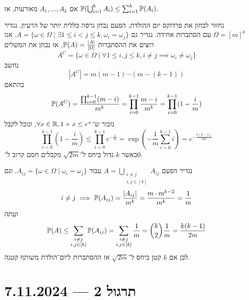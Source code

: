 \begin{theorem}
	אם $A_1, \dots, A_k$ מאורעות, אז $\mathbb{P}(\bigcup_{i = 1}^k A_i) \le \sum_{i = 1}^k \mathbb{P}(A_i)$.
\end{theorem}
\begin{example}
	נחזור לבחון את פרדוקס יום ההולדת, הפעם נבחן גרסה כללית יותר של הרעיון.
	נגדיר $\Omega = {[m]}^k$ עם הסתברות אחידה.
	נגדיר גם $A = \{ \omega \in \Omega \mid \exists 1 \le i < j \le k, \omega_i = \omega_j \}$.
	אנו רוצים את ההסתברות $\mathbb{P}(A) = \frac{|A|}{|\Omega|}$, אז נבחן את המשלים
	\[
		A^C = \{ \omega \in \Omega \mid \forall 1 \le i, j \le k, i \ne j \implies \omega_i \ne \omega_j \}
	\]
	נחשב
	\[
		|A^C| = m (m - 1) \cdots (m - (k - 1))
	\]
	בהתאם
	\[
		\mathbb{P}(A^C)
		= \frac{\prod_{i = 0}^{k - 1} (m - i)}{m^k}
		= \prod_{i = 0}^{k - 1} \frac{m - i}{m^k}
		= \prod_{i = 0}^{k - 1} (1 - \frac{i}{m})
	\]
	נזכור ש־$\forall x \in \mathbb{R}, 1 + x \le e^x$, ונוכל לקבל
	\[
		\prod_{i = 0}^{k - 1} (1 - \frac{i}{m})
		\le \prod_{i = 0}^{k - 1} e^{-\frac{i}{m}}
		= \exp(- \frac{1}{m} \sum_{i = 0}^{k - 1} i)
		= e^{- \frac{k(k - 1)}{2m}}
	\]
	כאשר $k$ גדול ביחס ל־$\sqrt{2m}$ מקבלים חסם קרוב ל־$0$.

נגדיר הפעם $A = \bigcup_{\substack{i \ne j \\ i, j \in [k]}} A_{ij}$ עבור $A_{ij} = \{ \omega \in \Omega \mid \omega_i = \omega_j \}$.
	וגם
	\[
		i \ne j \implies \mathbb{P}(A_{ij}) = \frac{|A_{ij}|}{m^k} = \frac{m \cdot m^{k - 2}}{m^k} = \frac{1}{m}
	\]
	ועתה
	\[
		\mathbb{P}(A)
		\le \sum_{\substack{i \ne j \\ i, j \in [k]}} \mathbb{P}(A_{ij})
		= \sum_{\substack{i \ne j \\ i, j \in [k]}} \frac{1}{m}
		= \binom{k}{2} \frac{1}{m}
		= \frac{k (k - 1)}{2m}
	\]
	לכן אם $k$ קטן ביחס ל־$\sqrt{2m}$ אז ההסתברות ליום־הולדת משותף קטנה.
\end{example}

\section{תרגול 2 --- 7.11.2024}

